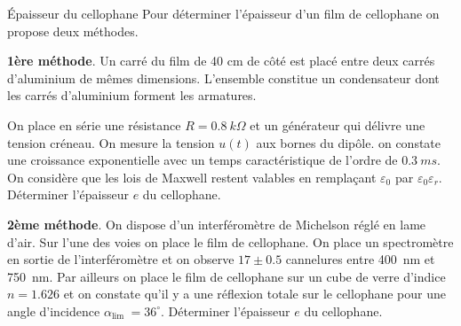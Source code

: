 \begin{exo}[PC][1][colle]{Épaisseur du cellophane}
Pour déterminer l'épaisseur d'un film de cellophane on propose deux méthodes.
\begin{quest}
  \item	
  \textbf{1ère méthode}. Un carré du film de 40 cm de côté est placé entre deux carrés d'aluminium de mêmes dimensions. L'ensemble constitue un condensateur dont les carrés d'aluminium forment les armatures.
  
  On place en série une résistance $R=\SI{0,8}{k\Omega}$ et un générateur qui délivre une tension créneau. On mesure la tension $u(t)$ aux bornes du dipôle.
  on constate une croissance exponentielle avec un temps caractéristique de l'ordre de $\SI{0,3}{ms}$.
  On considère que les lois de Maxwell restent valables en remplaçant $\varepsilon_0$ par $\varepsilon_0 \varepsilon_r$.  Déterminer l'épaisseur $e$ du cellophane.
  \item \textbf{2ème méthode}. On dispose d'un interféromètre de Michelson réglé en lame d'air. Sur l'une des voies on place le film de cellophane. On place un spectromètre en sortie de l'interféromètre et on observe $17 \pm \num{0,5}$ cannelures entre \SI{400}{nm} et \SI{750}{nm}.
  Par ailleurs on place le film de cellophane sur un cube de verre d'indice $n=\num{1,626}$ et on constate qu'il y a une réflexion totale sur le cellophane pour une angle d'incidence $\alpha_{\text {lim }}=36^{\circ}$.
  Déterminer l'épaisseur $e$ du cellophane.
\end{quest}

\end{exo}

